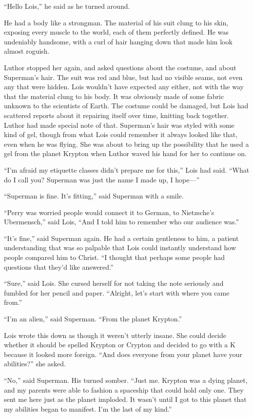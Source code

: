 ``Hello Lois,'' he said as he turned around.

He had a body like a strongman. The material of his suit clung to his
skin, exposing every muscle to the world, each of them perfectly
defined. He was undeniably handsome, with a curl of hair hanging down
that made him look almost roguish.

Luthor stopped her again, and asked questions about the costume, and
about Superman's hair. The suit was red and blue, but had no visible
seams, not even any that were hidden. Lois wouldn't have expected any
either, not with the way that the material clung to his body. It was
obviously made of some fabric unknown to the scientists of Earth. The
costume could be damaged, but Lois had scattered reports about it
repairing itself over time, knitting back together. Luthor had made
special note of that. Superman's hair was styled with some kind of gel,
though from what Lois could remember it always looked like that, even
when he was flying. She was about to bring up the possibility that he
used a gel from the planet Krypton when Luthor waved his hand for her to
continue on.

``I'm afraid my etiquette classes didn't prepare me for this,'' Lois had
said. ``What do I call you? Superman was just the name I made up, I
hope---''

``Superman is fine. It's fitting,'' said Superman with a smile.

``Perry was worried people would connect it to German, to Nietzsche's
Ubermensch,'' said Lois, ``And I told him to remember who our audience
was.''

``It's fine,'' said Superman again. He had a certain gentleness to him,
a patient understanding that was so palpable that Lois could instantly
understand how people compared him to Christ. ``I thought that perhaps
some people had questions that they'd like answered.''

``Sure,'' said Lois. She cursed herself for not taking the note
seriously and fumbled for her pencil and paper. ``Alright, let's start
with where you came from.''

``I'm an alien,'' said Superman. ``From the planet Krypton.''

Lois wrote this down as though it weren't utterly insane. She could
decide whether it should be spelled Krypton or Crypton and decided to go
with a K because it looked more foreign. ``And does everyone from your
planet have your abilities?'' she asked.

``No,'' said Superman. His turned somber. ``Just me. Krypton was a dying
planet, and my parents were able to fashion a spaceship that could hold
only one. They sent me here just as the planet imploded. It wasn't until
I got to this planet that my abilities began to manifest. I'm the last
of my kind.''

